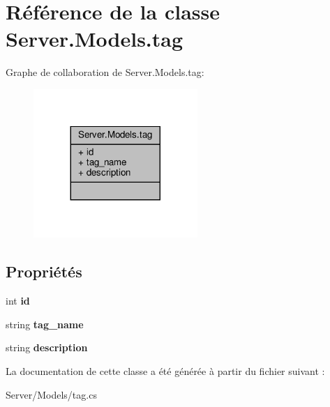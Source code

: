 \hypertarget{class_server_1_1_models_1_1tag}{}\section{Référence de la classe Server.\+Models.\+tag}
\label{class_server_1_1_models_1_1tag}


Graphe de collaboration de Server.\+Models.\+tag\+:
\nopagebreak
\begin{figure}[H]
\begin{center}
\leavevmode
\includegraphics[width=176pt]{class_server_1_1_models_1_1tag__coll__graph}
\end{center}
\end{figure}
\subsection*{Propriétés}
\begin{DoxyCompactItemize}
\item 
\mbox{\label{class_server_1_1_models_1_1tag_a3aa3cfdfe3541d6269b3bd21be4608e5}} 
int {\bfseries id}
\item 
\mbox{\label{class_server_1_1_models_1_1tag_a55337a12d2da7c9f2a3a504146b6ab37}} 
string {\bfseries tag\+\_\+name}
\item 
\mbox{\label{class_server_1_1_models_1_1tag_a2db60b27c7f21f735dd0b3fc5ed626fe}} 
string {\bfseries description}
\end{DoxyCompactItemize}


La documentation de cette classe a été générée à partir du fichier suivant \+:\begin{DoxyCompactItemize}
\item 
Server/\+Models/tag.\+cs\end{DoxyCompactItemize}
